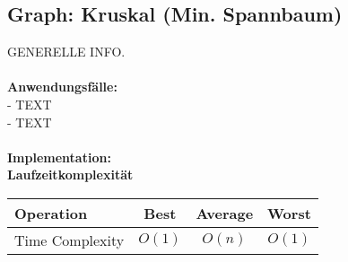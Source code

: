 \documentclass[../main.tex]{subfiles}
\begin{document}
	\subsection{Graph: Kruskal (Min. Spannbaum)}
	GENERELLE INFO. \\\\
	\textbf{Anwendungsfälle:}\\
	- TEXT\\
	- TEXT\\\\
	\textbf{Implementation:}\\
	 
	\textbf{Laufzeitkomplexität}\\
	\begin{table}[ht]
		\centering
		\begin{tabular}{l *{3}{c}}
			\toprule
			Operation & Best & Average & Worst\\
			\midrule
			Time Complexity & $O(1)$ & $O(n)$ & $O(1)$\\
			\bottomrule
		\end{tabular}
	\end{table}
	\clearpage
\end{document}
